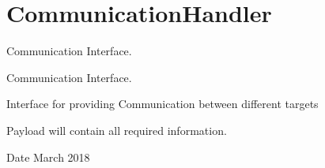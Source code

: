 \hypertarget{group__CommunicationHandler}{}\section{Communication\+Handler}
\label{group__CommunicationHandler}


Communication Interface.  


Communication Interface. 

Interface for providing Communication between different targets

Payload will contain all required information.

\begin{DoxyDate}{Date}
March 2018 
\end{DoxyDate}
